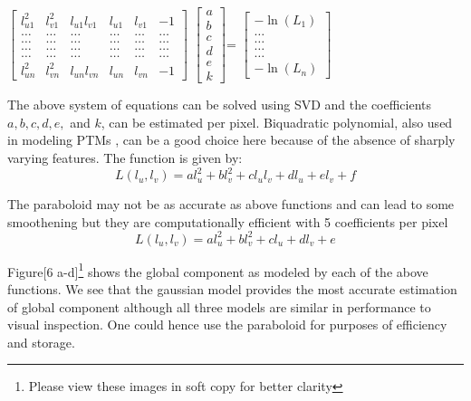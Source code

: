 \begin{center}
$\left[ {\begin{array}{cccccc}
 l_{u1}^2 & l_{v1}^2 & l_{u1}l_{v1} & l_{u1} & l_{v1} & -1 \\
  \dots & \dots  & \dots & \dots & \dots &  \dots \\
\dots & \dots  & \dots & \dots & \dots &  \dots \\
\dots & \dots  & \dots & \dots & \dots &  \dots \\
\dots & \dots  & \dots & \dots & \dots &  \dots \\
l_{un}^2 & l_{vn}^2 & l_{un}l_{vn} & l_{un} & l_{vn} & -1
 \end{array} } \right]
$
$\left[ {\begin{array}{c}
a\\b\\c\\d\\e\\k
 \end{array} } \right]
$=
$\left[ {\begin{array}{c}
-\ln(L_1)\\ \dots\\ \dots\\ \dots \\ \dots \\ -\ln(L_n)
 \end{array} } \right]
$\newline
\end{center}

The above system of equations can be solved using SVD and the coefficients
$a,b,c,d,e,$ and $k$, can be estimated per pixel. Biquadratic polynomial, also
used in modeling PTMs \cite{B6}, can be a good choice here because of the
absence of sharply varying features. The function is given by:
\begin{equation}
L(l_u,l_v) = al_u^2 + bl_v^2 + cl_ul_v + dl_u + el_v +f
\end{equation}

The paraboloid may not be as accurate as above functions and can lead to some
smoothening but they are computationally efficient with 5 coefficients per pixel
\begin{equation}
L(l_u,l_v)= al_u^2 + bl_v^2  + cl_u + dl_v +e
\end{equation}

Figure[6 a-d]\footnote{Please view these images in soft copy for better clarity}
shows the global component as modeled by each of the above functions. We see
that the gaussian model provides the most accurate estimation of global
component although all three models are similar in performance to visual
inspection. One could hence use the paraboloid for purposes of efficiency and
storage.

